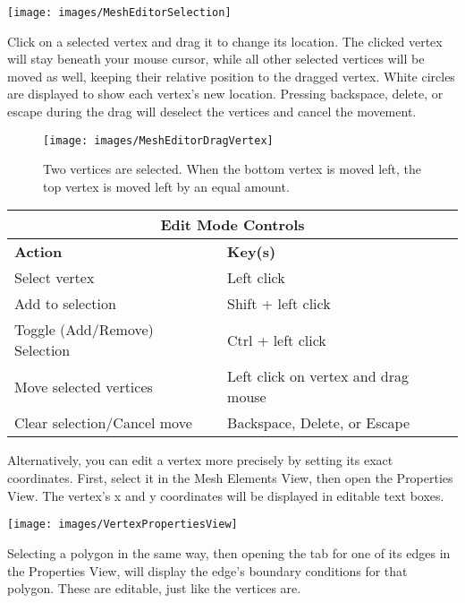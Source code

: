 \begin{center}
\texttt{[image: images/MeshEditorSelection]}
\end{center}

Click on a selected vertex and drag it to change its location. The clicked
vertex will stay beneath your mouse cursor, while all other selected vertices
will be moved as well, keeping their relative position to the dragged vertex.
White circles are displayed to show each vertex's new location. Pressing
backspace, delete, or escape during the drag will deselect the vertices and
cancel the movement.

\begin{figure}
\begin{center}
\texttt{[image: images/MeshEditorDragVertex]}
\caption{Two vertices are selected. When the bottom vertex is moved left, the
top vertex is moved left by an equal amount.}
\end{center}
\end{figure}

\begin{center}
    \begin{tabular}{| l | l |}
    \hline
    \multicolumn{2}{|c|}{\textbf{Edit Mode Controls}} \\
  	\hline
    \textbf{Action} & \textbf{Key(s)} \\ \hline
    Select vertex & Left click \\ \hline
    Add to selection & Shift + left click \\ \hline
    Toggle (Add/Remove) Selection & Ctrl + left click \\ \hline
    Move selected vertices & Left click on vertex and drag mouse \\ \hline
    Clear selection/Cancel move & Backspace, Delete, or Escape \\ 
    \hline
    \end{tabular}
\end{center}

Alternatively, you can edit a vertex more precisely by setting its exact
coordinates. First, select it in the Mesh Elements View, then open the
Properties View. The vertex's x and y coordinates will be displayed in editable
text boxes.

\begin{center}
\texttt{[image: images/VertexPropertiesView]}
\end{center}

Selecting a polygon in the same way, then opening the tab for one of its edges
in the Properties View, will display the edge's boundary conditions for that
polygon. These are editable, just like the vertices are.

